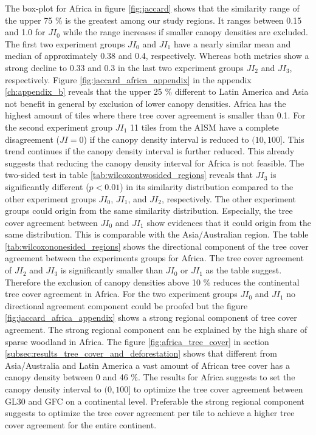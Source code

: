 			The box-plot for Africa in figure \ref{fig:jaccard} shows that the similarity range of the upper 75 \% is the greatest among our study regions. It ranges between 0.15 and 1.0 for $JI_0$ while the range increases if smaller canopy densities are excluded. The first two experiment groups $JI_0$ and $JI_1$ have a nearly similar mean and median of approximately 0.38 and 0.4, respectively. Whereas both metrics show a strong decline to 0.33 and 0.3 in the last two experiment groups $JI_2$ and $JI_3$, respectively. Figure \ref{fig:jaccard_africa_appendix} in the appendix \ref{ch:appendix_b} reveals that the upper 25 \% different to Latin America and Asia not benefit in general by exclusion of lower canopy densities. Africa has the highest amount of tiles where there tree cover agreement is smaller than 0.1. For the second experiment group $JI_1$ 11 tiles from the \ac{AISM} have a complete disagreement ($JI=0$) if the canopy density interval is reduced to $(10,100]$. This trend continues if the canopy density interval is further reduced. This already suggests that reducing the canopy density interval for Africa is not feasible. The two-sided test in table \ref{tab:wilcoxontwosided_regions} reveals that $JI_3$ is significantly different ($p<0.01$) in its similarity distribution compared to the other experiment groups $JI_0$, $JI_1$, and $JI_2$, respectively. The other experiment groups could origin from the same similarity distribution. Especially, the tree cover agreement between $JI_0$ and $JI_1$ show evidences that it could origin from the same distribution. This is comparable with the Asia/Australian region. The table \ref{tab:wilcoxononesided_regions} shows the directional component of the tree cover agreement between the experiments groups for Africa. The tree cover agreement of $JI_2$ and $JI_3$ is significantly smaller than $JI_0$ or $JI_1$ as the table suggest. Therefore the exclusion of canopy densities above 10 \% reduces the continental tree cover agreement in Africa. For the two experiment groups $JI_0$ and $JI_1$ no directional agreement component could be proofed but the figure \ref{fig:jaccard_africa_appendix} shows a strong regional component of tree cover agreement. The strong regional component can be explained by the high share of sparse woodland in Africa. The figure \ref{fig:africa_tree_cover} in section \ref{subsec:results_tree_cover_and_deforestation} shows that different from Asia/Australia and Latin America a vast amount of African tree cover has a canopy density between 0 and 46 \%. The results for Africa suggests to set the canopy density interval to $(0,100]$ to optimize the tree cover agreement between \ac{GL30} and \ac{GFC} on a continental level. Preferable the strong regional component suggests to optimize the tree cover agreement per tile to achieve a higher tree cover agreement for the entire continent.

